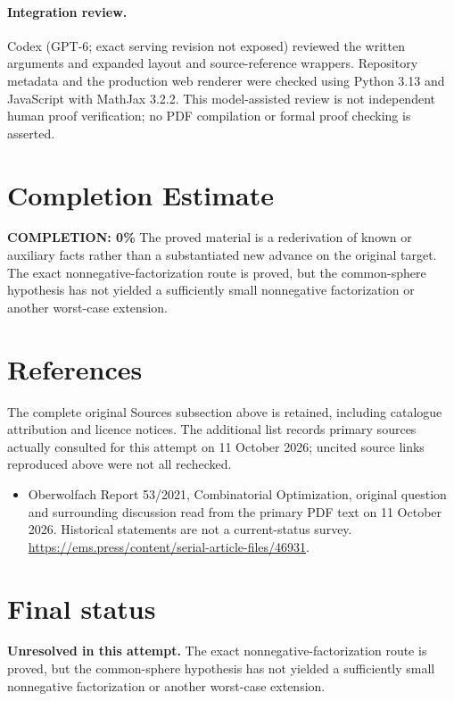 \documentclass[11pt]{article}
\begin{document}
\paragraph{Integration review.} Codex (GPT-6; exact serving revision not exposed) reviewed the written arguments and expanded layout and source-reference wrappers. Repository metadata and the production web renderer were checked using Python 3.13 and JavaScript with MathJax 3.2.2. This model-assisted review is not independent human proof verification; no PDF compilation or formal proof checking is asserted.

\section{Completion Estimate}
\noindent\textbf{COMPLETION: 0\%}
The proved material is a rederivation of known or auxiliary facts rather than a substantiated new advance on the original target. The exact nonnegative-factorization route is proved, but the common-sphere hypothesis has not yielded a sufficiently small nonnegative factorization or another worst-case extension.
\section{References}
The complete original Sources subsection above is retained, including catalogue attribution and licence notices. The additional list records primary sources actually consulted for this attempt on 11 October 2026; uncited source links reproduced above were not all rechecked.
\begin{itemize}
\item Oberwolfach Report 53/2021, Combinatorial Optimization, original question and surrounding discussion read from the primary PDF text on 11 October 2026. Historical statements are not a current-status survey. \url{https://ems.press/content/serial-article-files/46931}.
\end{itemize}
\section{Final status}
\textbf{Unresolved in this attempt.} The exact nonnegative-factorization route is proved, but the common-sphere hypothesis has not yielded a sufficiently small nonnegative factorization or another worst-case extension.
\end{document}
